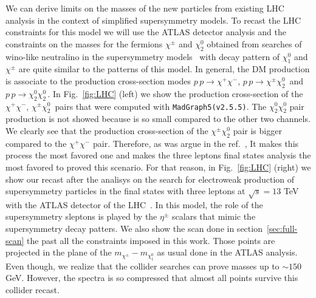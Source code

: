 \documentclass[12pt,letterpaper]{article}
\begin{document}
%
We can derive limits on the masses of the new particles from existing LHC analysis in the context of simplified supersymmetry models. 
To recast the LHC constraints for this model we will use the ATLAS detector analysis and the constraints on the masses for the fermions $\chi^{\pm}$ and $\chi_2^0$ obtained from searches of wino-like neutralino in the supersymmetry models~\cite{Aaboud:2018jiw} with decay pattern of $\chi_1^0$ and $\chi^{\pm}$ are quite similar to the patterns of this model.
In general, the DM production is associate to the production cross-section modes $p\,p\to\chi^+\chi^-$, $p\,p\to\chi^{\pm}\chi_2^0\,$ and $p\,p\to\chi_2^0\chi_2^0\,$. 
In Fig.~\ref{fig:LHC} (left) we show the production cross-section of the $\chi^+\chi^-$, $\chi^{\pm}\chi_2^0\,$ pairs that were computed with \texttt{MadGraph5(v2.5.5)}\cite{Alwall:2014hca}.
The $\chi_2^0\chi_2^0$ pair production is not showed because is so small compared to the other two channels. 
We clearly see that the production cross-section of the $\chi^{\pm}\chi^0_2$ pair is bigger compared to the $\chi^{+}\chi^{-}$ pair. 
Therefore, as was argue in the ref.~\cite{Choubey:2017yyn}, It makes this process the most favored one and makes the three leptons final states analysis the most favored to proved this scenario. 
For that reason, in Fig.~\ref{fig:LHC} (right) we show our recast after the analisys on the search for electroweak production of supersymmetry particles in the final states with three leptons at $\sqrt{s}=13$ TeV with the ATLAS detector of the LHC~\cite{Aaboud:2018jiw}. 
In this model, the role of the supersymmetry sleptons is played by the $\eta^{\pm}$ scalars that mimic the supersymmetry decay patters.
We also show the scan done in section~\ref{sec:full-scan} the past all the constraints imposed in this work. Those points are projected in the plane of the $m_{\chi^{\pm}}-m_{\chi_1^0}$ as usual done in the ATLAS analysis. Even though, we realize that the collider searches can prove masses up to $\sim 150$ GeV. However, the spectra is so compressed that almost all points survive this collider recast.
 







\end{document}
